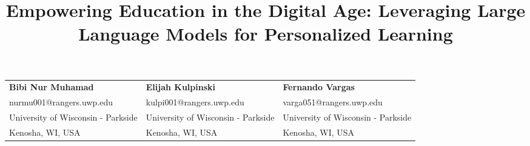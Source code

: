 \documentclass[]{article}
\title{Empowering Education in the Digital Age: Leveraging Large Language Models for Personalized Learning}
\author{}
\date{}
\begin{document}
\maketitle

\vspace{-4\baselineskip} %

\begin{center}
\begin{tabularx}{\textwidth}{@{}>{\centering\arraybackslash}X@{\quad}>{\centering\arraybackslash}X@{\quad}>{\centering\arraybackslash}X@{}}
\textbf{Bibi Nur Muhamad} & \textbf{Elijah Kulpinski} & \textbf{Fernando Vargas} \\
nurmu001@rangers.uwp.edu & kulpi001@rangers.uwp.edu & varga051@rangers.uwp.edu \\
University of Wisconsin - Parkside & University of Wisconsin - Parkside & University of Wisconsin - Parkside \\
Kenosha, WI, USA & Kenosha, WI, USA & Kenosha, WI, USA \\
\end{tabularx}
\end{center}

\vspace{1\baselineskip} %
\end{document}
